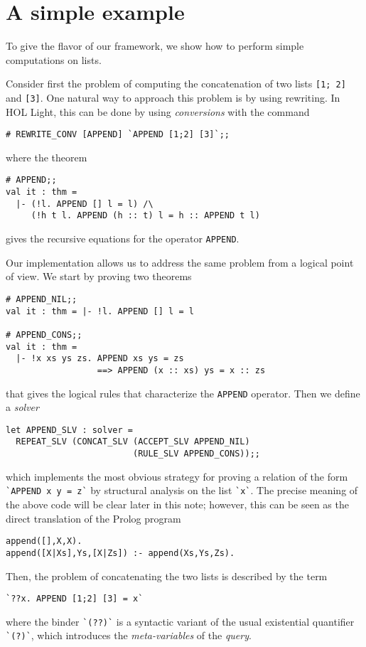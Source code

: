 \section{A simple example}
\label{sec:an-simple-example}

To give the flavor of our framework, we show how to perform simple
computations on lists.

Consider first the problem of computing the concatenation of two lists
\verb|[1; 2]| and \verb|[3]|.  One natural way to approach this
problem is by using rewriting.  In HOL Light, this can be done by using
\emph{conversions} with the command
\begin{verbatim}
# REWRITE_CONV [APPEND] `APPEND [1;2] [3]`;;
\end{verbatim}
where the theorem
\begin{verbatim}
# APPEND;;
val it : thm =
  |- (!l. APPEND [] l = l) /\
     (!h t l. APPEND (h :: t) l = h :: APPEND t l)
\end{verbatim}
gives the recursive equations for the operator \verb|APPEND|.

Our implementation allows us to address the same problem from a
logical point of view.  We start by proving two theorems
\begin{verbatim}
# APPEND_NIL;;
val it : thm = |- !l. APPEND [] l = l

# APPEND_CONS;;
val it : thm =
  |- !x xs ys zs. APPEND xs ys = zs
                  ==> APPEND (x :: xs) ys = x :: zs
\end{verbatim}
that gives the logical rules that characterize the \verb|APPEND|
operator.  Then we define a \emph{solver}
\begin{verbatim}
let APPEND_SLV : solver =
  REPEAT_SLV (CONCAT_SLV (ACCEPT_SLV APPEND_NIL)
                         (RULE_SLV APPEND_CONS));;
\end{verbatim}
which implements the most obvious strategy for proving a relation of
the form \verb|`APPEND x y = z`| by structural analysis on the list
\verb|`x`|.  The precise meaning of the above code will be clear later
in this note; however, this can be seen as the direct translation of
the Prolog program
\begin{verbatim}
append([],X,X).
append([X|Xs],Ys,[X|Zs]) :- append(Xs,Ys,Zs).
\end{verbatim}

Then, the problem of concatenating the two lists is described by the
term
\begin{verbatim}
`??x. APPEND [1;2] [3] = x`
\end{verbatim}
where the binder \verb|`(??)`| is a syntactic variant of the usual
existential quantifier \verb|`(?)`|, which introduces the
\emph{meta-variables} of the \emph{query}.

